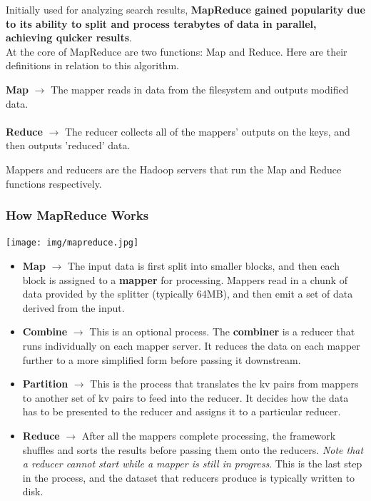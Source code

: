 \documentclass[english, 10pt]{article}
\begin{document}
Initially used for analyzing search results, \textbf{MapReduce gained popularity due to its ability to split and process terabytes of data in parallel, achieving quicker results}.\\

At the core of MapReduce are two functions: Map and Reduce. Here are their definitions in relation to this algorithm.\\

\begin{tcolorbox}[title=Definition:,colframe=red!75!black,colback=red!5!white,arc=0pt,fonttitle=\bfseries]
\textbf{Map} $\rightarrow$ The mapper reads in data from the filesystem and outputs modified data.\\\\
\textbf{Reduce} $\rightarrow$ The reducer collects all of the mappers' outputs on the keys, and then outputs 'reduced' data.
\end{tcolorbox}

\hfill \break Mappers and reducers are the Hadoop servers that run the Map and Reduce functions respectively.\\

\subsubsection{How MapReduce Works}

\texttt{[image: img/mapreduce.jpg]} \\

\begin{itemize}
	\item \textbf{Map} $\rightarrow$ The input data is first split into smaller blocks, and then each block is assigned to a \textbf{mapper} for processing. Mappers read in a chunk of data provided by the splitter (typically 64MB), and then emit a set of data derived from the input.
	\item \textbf{Combine} $\rightarrow$ This is an optional process. The \textbf{combiner} is a reducer that runs individually on each mapper server. It reduces the data on each mapper further to a more simplified form before passing it downstream.
	\item \textbf{Partition} $\rightarrow$ This is the process that translates the kv pairs from mappers to another set of kv pairs to feed into the reducer. It decides how the data has to be presented to the reducer and assigns it to a particular reducer.
	\item \textbf{Reduce} $\rightarrow$ After all the mappers complete processing, the framework shuffles and sorts the results before passing them onto the reducers. \textit{Note that a reducer cannot start while a mapper is still in progress}. This is the last step in the process, and the dataset that reducers produce is typically written to disk.
\end{itemize}
\end{document}
